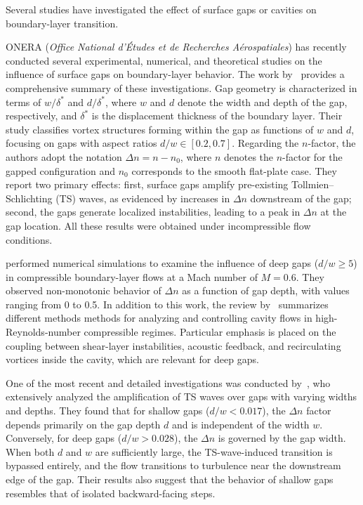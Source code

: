\documentclass[twocolumn,10pt]{tsfp}
\begin{document}
Several studies have investigated the effect of surface gaps or cavities on boundary-layer transition.

ONERA (\emph{Office National d'Études et de Recherches Aérospatiales}) has recently conducted several experimental, numerical, and theoretical studies on the influence of surface gaps on boundary-layer behavior. The work by~\cite{beguetONERA} provides a comprehensive summary of these investigations. Gap geometry is characterized in terms of $w/\delta^*$ and $d/\delta^*$, where $w$ and $d$ denote the width and depth of the gap, respectively, and $\delta^*$ is the displacement thickness of the boundary layer. Their study classifies vortex structures forming within the gap as functions of $w$ and $d$, focusing on gaps with aspect ratios $d/w \in [0.2, 0.7]$. Regarding the $n$-factor, the authors adopt the notation $\Delta n = n - n_0$, where $n$ denotes the $n$-factor for the gapped configuration and $n_0$ corresponds to the smooth flat-plate case. They report two primary effects: first, surface gaps amplify pre-existing Tollmien--Schlichting (TS) waves, as evidenced by increases in $\Delta n$ downstream of the gap; second, the gaps generate localized instabilities, leading to a peak in $\Delta n$ at the gap location. All these results were obtained under incompressible flow conditions.

\cite{zahnRist} performed numerical simulations to examine the influence of deep gaps ($d/w \geq 5$) in compressible boundary-layer flows at a Mach number of $M = 0.6$. They observed non-monotonic behavior of $\Delta n$ as a function of gap depth, with values ranging from 0 to 0.5. In addition to this work, the review by~\cite{dynandcontrol} summarizes different methods methods for analyzing and controlling cavity flows in  high-Reynolds-number compressible regimes. Particular emphasis is placed on the coupling between shear-layer instabilities, acoustic feedback, and recirculating vortices inside the cavity, which are relevant for deep gaps.

One of the most recent and detailed investigations was conducted by~\cite{jeffGaps}, who extensively analyzed the amplification of TS waves over gaps with varying widths and depths. They found that for shallow gaps ($d/w < 0.017$), the $\Delta n$ factor depends primarily on the gap depth $d$ and is independent of the width $w$. Conversely, for deep gaps ($d/w > 0.028$), the $\Delta n$ is governed by the gap width. When both $d$ and $w$ are sufficiently large, the TS-wave-induced transition is bypassed entirely, and the flow transitions to turbulence near the downstream edge of the gap. Their results also suggest that the behavior of shallow gaps resembles that of isolated backward-facing steps.
\end{document}
